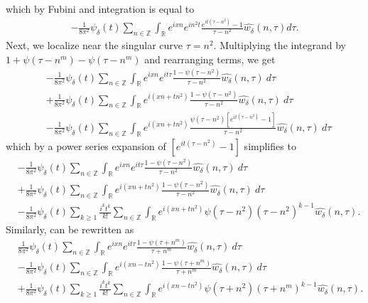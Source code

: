 \documentclass[12pt,reqno]{amsart}
\numberwithin{equation}{section}  %
\renewcommand{\cref}{\Cref}
\newcommand{\rr}{\mathbb{R}}
\newcommand{\zz}{\mathbb{Z}}
\newcommand{\wh}{\widehat}
\begin{document}
%
%
which by Fubini and integration is equal to
%
%
\begin{equation*}
\begin{split}
  -\frac{1}{8 \pi^{2}}  \psi_{\delta}(t) \sum_{n \in \zz} \int_{\rr} e^{ixn}
  e^{in^{2}t} \frac{e^{it(\tau - n^{2})} -1}{\tau - n^{2}}\wh{w_{\delta}}(n, \tau) d \tau.
\end{split}
\end{equation*}
%
Next, we localize near the singular curve $\tau =  n^2$.  Multiplying the
integrand by $1 + \psi(\tau -
n^m) - \psi(\tau -
n^m) $ and
rearranging terms, we get
%
%
\begin{equation*}
	\begin{split}
	& - \frac{1}{8 \pi^2}  \psi_{\delta}(t) \sum_{n \in \zz} \int_\rr e^{ixn}  
		e^{it \tau} \frac{1 - \psi(\tau - n^{2}) 
}{\tau - n^{2}} \wh{w_{\delta}}(n, \tau) \ d \tau
		\\
		& + \frac{1}{8 \pi^2}  \psi_{\delta}(t) \sum_{n \in \zz} \int _\rr e^{i(xn + 
		t n^{2})}
		 \frac{1- \psi(\tau - n^{2})}{\tau - n^{2}} \wh{w_{\delta}}(n, \tau) \ d \tau
		\\
		& - \frac{1}{8 \pi^2}  \psi_{\delta}(t) \sum_{n \in \zz} \int_\rr
		e^{i(xn + t n^{2})}
		\frac{\psi(\tau - n^{2})\left[ e^{it(\tau - n^{2})}-1 
		\right]}{\tau - n^{2}} \wh{w_{\delta}}(n, \tau) \ d \tau
	\end{split}
\end{equation*}
%
%
which by a power series expansion of $[e^{it(\tau - n^{2})}-1]$ simplifies  
to
%
%
\begin{align}
		\label{main-int-expression'-2}
		& -\frac{1}{8 \pi^2}  \psi_{\delta}(t) \sum_{n\in \zz} \int_\rr e^{ixn}  
		e^{it \tau} \frac{1 - \psi(\tau -  n^{2}) 
}{\tau -  n^{2}} \wh{w_{\delta}}(n, \tau) \ d \tau
		\\
		\label{main-int-expression'-3}
		& + \frac{1}{8 \pi^2}  \psi_{\delta}(t) \sum_{n\in \zz} \int_\rr e^{i(xn + 
		t n^{2})}
		 \frac{1- \psi(\tau -  n^{2})}{\tau -  n^{2}} \wh{w_{\delta}}(n, \tau) \ d \tau
		\\
		\label{main-int-expression'-4}
		& - \frac{1}{8 \pi^2}  \psi_{\delta}(t) \sum_{k \ge 1} \frac{i^k t^k}{k!}
		\sum_{n \in \zz} \int_\rr e^{i(xn + t n^{2} )}
		\psi(\tau -  n^{2}) (\tau -  n^{2})^{k-1} \wh{w_{\delta}}(n, \tau).
\end{align}
%
Similarly, \cref{term-4} can be rewritten as
%
\begin{align}
		\label{main-int-expression''-2}
		& \frac{1}{8 \pi^2}  \psi_{\delta}(t) \sum_{n\in \zz} \int_\rr e^{ixn}  
		e^{it \tau} \frac{1 - \psi(\tau +  n^m) 
}{\tau +  n^m} \wh{w_{\delta}}(n, \tau) \ d \tau
		\\
		\label{main-int-expression''-3}
		&  - \frac{1}{8 \pi^2}  \psi_{\delta}(t) \sum_{n\in \zz} \int_\rr e^{i(xn - 
		t n^2)}
		 \frac{1- \psi(\tau +  n^m)}{\tau +  n^m} \wh{w_{\delta}}(n, \tau) \ d \tau
		\\
		\label{main-int-expression''-4}
		& + \frac{1}{8 \pi^2}  \psi_{\delta}(t) \sum_{k \ge 1} \frac{i^k t^k}{k!}
		\sum_{n \in \zz} \int_\rr e^{i(xn - t n^2 )}
		\psi(\tau +  n^2) (\tau +  n^m)^{k-1} \wh{w_{\delta}}(n, \tau).
\end{align}
\end{document}
